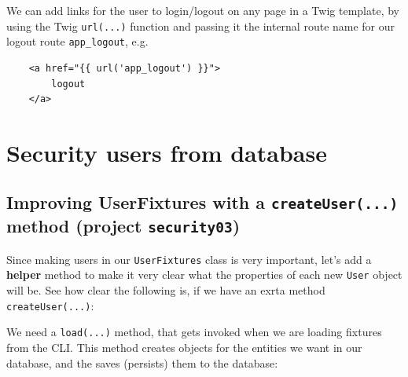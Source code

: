 \documentclass[a4paperpaper,openright]{book}
\begin{document}
We can add links for the user to login/logout on any page in a Twig
template, by using the Twig \texttt{url(...)} function and passing it
the internal route name for our logout route \texttt{app\_logout}, e.g.

\begin{verbatim}
    <a href="{{ url('app_logout') }}">
        logout
    </a>
\end{verbatim}

\hypertarget{security-users-from-database}{%
\chapter{Security users from
database}\label{security-users-from-database}}

\hypertarget{improving-userfixtures-with-a-createuser...-method-project-security03}{%
\section{\texorpdfstring{Improving UserFixtures with a
\texttt{createUser(...)} method (project
\texttt{security03})}{Improving UserFixtures with a createUser(...) method (project security03)}}\label{improving-userfixtures-with-a-createuser...-method-project-security03}}

Since making users in our \texttt{UserFixtures} class is very important,
let's add a \textbf{helper} method to make it very clear what the
properties of each new \texttt{User} object will be. See how clear the
following is, if we have an exrta method \texttt{createUser(...)}:

We need a \texttt{load(...)} method, that gets invoked when we are
loading fixtures from the CLI. This method creates objects for the
entities we want in our database, and the saves (persists) them to the
database:
\end{document}
